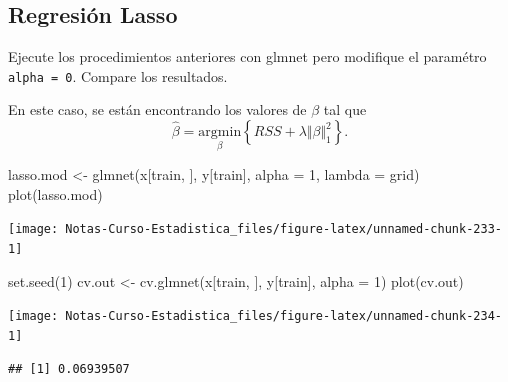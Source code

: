 \documentclass[
  12pt,
]{book}
\newenvironment{Shaded}{\begin{snugshade}}{\end{snugshade}}
\newcommand{\AttributeTok}[1]{\textcolor[rgb]{0.77,0.63,0.00}{#1}}
\newcommand{\DecValTok}[1]{\textcolor[rgb]{0.00,0.00,0.81}{#1}}
\newcommand{\FunctionTok}[1]{\textcolor[rgb]{0.00,0.00,0.00}{#1}}
\newcommand{\NormalTok}[1]{#1}
\newcommand{\OtherTok}[1]{\textcolor[rgb]{0.56,0.35,0.01}{#1}}
\newcommand{\SpecialCharTok}[1]{\textcolor[rgb]{0.00,0.00,0.00}{#1}}
\begin{document}
\hypertarget{regresiuxf3n-lasso-1}{%
\subsection{Regresión Lasso}\label{regresiuxf3n-lasso-1}}

Ejecute los procedimientos anteriores con glmnet pero modifique el
paramétro \texttt{alpha\ =\ 0}. Compare los resultados.

En este caso, se están encontrando los valores de \(\beta\) tal que
\[\hat{\beta} = \underset{\beta}{\mathrm{argmin}} \left\{RSS + \lambda \Vert \beta \Vert_1^2\right\}.\]

\begin{Shaded}
\begin{Highlighting}[]
\NormalTok{lasso.mod }\OtherTok{\textless{}{-}} \FunctionTok{glmnet}\NormalTok{(x[train, ], y[train], }\AttributeTok{alpha =} \DecValTok{1}\NormalTok{,}
    \AttributeTok{lambda =}\NormalTok{ grid)}
\FunctionTok{plot}\NormalTok{(lasso.mod)}
\end{Highlighting}
\end{Shaded}

\begin{center}\texttt{[image: Notas-Curso-Estadistica\_files/figure-latex/unnamed-chunk-233-1]} \end{center}

\begin{Shaded}
\begin{Highlighting}[]
\FunctionTok{set.seed}\NormalTok{(}\DecValTok{1}\NormalTok{)}
\NormalTok{cv.out }\OtherTok{\textless{}{-}} \FunctionTok{cv.glmnet}\NormalTok{(x[train, ], y[train], }\AttributeTok{alpha =} \DecValTok{1}\NormalTok{)}
\FunctionTok{plot}\NormalTok{(cv.out)}
\end{Highlighting}
\end{Shaded}

\begin{center}\texttt{[image: Notas-Curso-Estadistica\_files/figure-latex/unnamed-chunk-234-1]} \end{center}

\begin{Shaded}
\end{Shaded}

\begin{verbatim}
## [1] 0.06939507
\end{verbatim}
\end{document}
